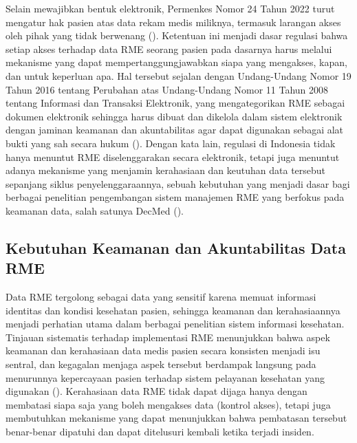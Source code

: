 Selain mewajibkan bentuk elektronik, Permenkes Nomor 24 Tahun 2022
turut mengatur hak pasien atas data rekam medis miliknya, termasuk
larangan akses oleh pihak yang tidak berwenang
(\cite{permenkes24_2022}). Ketentuan ini menjadi dasar regulasi bahwa
setiap akses terhadap data RME seorang pasien pada dasarnya harus
melalui mekanisme yang dapat mempertanggungjawabkan siapa yang
mengakses, kapan, dan untuk keperluan apa. Hal tersebut sejalan dengan
Undang-Undang Nomor 19 Tahun 2016 tentang Perubahan atas
Undang-Undang Nomor 11 Tahun 2008 tentang Informasi dan Transaksi
Elektronik, yang mengategorikan RME sebagai dokumen elektronik
sehingga harus dibuat dan dikelola dalam sistem elektronik dengan
jaminan keamanan dan akuntabilitas agar dapat digunakan sebagai alat
bukti yang sah secara hukum (\cite{uu19_2016}). Dengan kata lain,
regulasi di Indonesia tidak hanya menuntut RME diselenggarakan secara
elektronik, tetapi juga menuntut adanya mekanisme yang menjamin
kerahasiaan dan keutuhan data tersebut sepanjang siklus
penyelenggaraannya, sebuah kebutuhan yang menjadi dasar bagi berbagai
penelitian pengembangan sistem manajemen RME yang berfokus pada
keamanan data, salah satunya DecMed (\cite{DecMed}).

\subsection{Kebutuhan Keamanan dan Akuntabilitas Data RME}
\label{subsec:keamanan-akuntabilitas-rme}

Data RME tergolong sebagai data yang sensitif karena memuat informasi
identitas dan kondisi kesehatan pasien, sehingga keamanan dan
kerahasiaannya menjadi perhatian utama dalam berbagai penelitian
sistem informasi kesehatan. Tinjauan sistematis terhadap implementasi
RME menunjukkan bahwa aspek keamanan dan kerahasiaan data medis pasien
secara konsisten menjadi isu sentral, dan kegagalan menjaga aspek
tersebut berdampak langsung pada menurunnya kepercayaan pasien
terhadap sistem pelayanan kesehatan yang digunakan
(\cite{pramesti2024keamanan}). Kerahasiaan data RME tidak dapat dijaga
hanya dengan membatasi siapa saja yang boleh mengakses data (kontrol
akses), tetapi juga membutuhkan mekanisme yang dapat menunjukkan bahwa
pembatasan tersebut benar-benar dipatuhi dan dapat ditelusuri kembali
ketika terjadi insiden.

